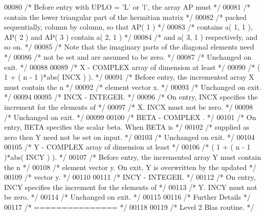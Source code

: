 \begin{DoxyCode}
00080 \textcolor{comment}{/*           Before entry with UPLO = 'L' or 'l', the array AP must */}
00081 \textcolor{comment}{/*           contain the lower triangular part of the hermitian matrix */}
00082 \textcolor{comment}{/*           packed sequentially, column by column, so that AP( 1 ) */}
00083 \textcolor{comment}{/*           contains a( 1, 1 ), AP( 2 ) and AP( 3 ) contain a( 2, 1 ) */}
00084 \textcolor{comment}{/*           and a( 3, 1 ) respectively, and so on. */}
00085 \textcolor{comment}{/*           Note that the imaginary parts of the diagonal elements need */}
00086 \textcolor{comment}{/*           not be set and are assumed to be zero. */}
00087 \textcolor{comment}{/*           Unchanged on exit. */}
00088 
00089 \textcolor{comment}{/*  X      - COMPLEX          array of dimension at least */}
00090 \textcolor{comment}{/*           ( 1 + ( n - 1 )*abs( INCX ) ). */}
00091 \textcolor{comment}{/*           Before entry, the incremented array X must contain the n */}
00092 \textcolor{comment}{/*           element vector x. */}
00093 \textcolor{comment}{/*           Unchanged on exit. */}
00094 
00095 \textcolor{comment}{/*  INCX   - INTEGER. */}
00096 \textcolor{comment}{/*           On entry, INCX specifies the increment for the elements of */}
00097 \textcolor{comment}{/*           X. INCX must not be zero. */}
00098 \textcolor{comment}{/*           Unchanged on exit. */}
00099 
00100 \textcolor{comment}{/*  BETA   - COMPLEX         . */}
00101 \textcolor{comment}{/*           On entry, BETA specifies the scalar beta. When BETA is */}
00102 \textcolor{comment}{/*           supplied as zero then Y need not be set on input. */}
00103 \textcolor{comment}{/*           Unchanged on exit. */}
00104 
00105 \textcolor{comment}{/*  Y      - COMPLEX          array of dimension at least */}
00106 \textcolor{comment}{/*           ( 1 + ( n - 1 )*abs( INCY ) ). */}
00107 \textcolor{comment}{/*           Before entry, the incremented array Y must contain the n */}
00108 \textcolor{comment}{/*           element vector y. On exit, Y is overwritten by the updated */}
00109 \textcolor{comment}{/*           vector y. */}
00110 
00111 \textcolor{comment}{/*  INCY   - INTEGER. */}
00112 \textcolor{comment}{/*           On entry, INCY specifies the increment for the elements of */}
00113 \textcolor{comment}{/*           Y. INCY must not be zero. */}
00114 \textcolor{comment}{/*           Unchanged on exit. */}
00115 
00116 \textcolor{comment}{/*  Further Details */}
00117 \textcolor{comment}{/*  =============== */}
00118 
00119 \textcolor{comment}{/*  Level 2 Blas routine. */}

\end{DoxyCode}
